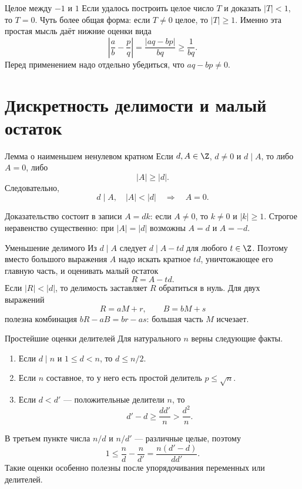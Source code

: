 \begin{methodbox}{Целое между $-1$ и $1$}
Если удалось построить целое число $T$ и доказать $|T|<1$, то
$T=0$. Чуть более общая форма: если $T\ne0$ целое, то $|T|\ge1$.
Именно эта простая мысль даёт нижние оценки вида
\[
  \left|\frac ab-\frac pq\right|
  =\frac{|aq-bp|}{bq}\ge\frac1{bq}.
\]
Перед применением надо отдельно убедиться, что $aq-bp\ne0$.
\end{methodbox}

\section{Дискретность делимости и малый остаток}

\begin{theorembox}{Лемма о наименьшем ненулевом кратном}
Если $d,A\in\Z$, $d\ne0$ и $d\mid A$, то либо $A=0$, либо
\[
  |A|\ge|d|.
\]
Следовательно,
\[
  d\mid A,\quad |A|<|d|
  \quad\Longrightarrow\quad A=0.
\]
\end{theorembox}

Доказательство состоит в записи $A=dk$: если $A\ne0$, то
$k\ne0$ и $|k|\ge1$. Строгое неравенство существенно: при
$|A|=|d|$ возможны $A=d$ и $A=-d$.

\begin{methodbox}{Уменьшение делимого}
Из $d\mid A$ следует $d\mid A-td$ для любого $t\in\Z$. Поэтому
вместо большого выражения $A$ надо искать кратное $td$, уничтожающее
его главную часть, и оценивать малый остаток
\[
  R=A-td.
\]
Если $|R|<|d|$, то делимость заставляет $R$ обратиться в нуль.
Для двух выражений
\[
  R=aM+r,\qquad B=bM+s
\]
полезна комбинация $bR-aB=br-as$: большая часть $M$ исчезает.
\end{methodbox}

\begin{theorembox}{Простейшие оценки делителей}
Для натурального $n$ верны следующие факты.
\begin{enumerate}
  \item Если $d\mid n$ и $1\le d<n$, то $d\le n/2$.
  \item Если $n$ составное, то у него есть простой делитель
        $p\le\sqrt n$.
  \item Если $d<d'$ --- положительные делители $n$, то
        \[
          d'-d\ge\frac{dd'}n>\frac{d^2}n.
        \]
\end{enumerate}
\end{theorembox}

В третьем пункте числа $n/d$ и $n/d'$ --- различные целые, поэтому
\[
  1\le\frac nd-\frac n{d'}
  =\frac{n(d'-d)}{dd'}.
\]
Такие оценки особенно полезны после упорядочивания переменных или
делителей.

